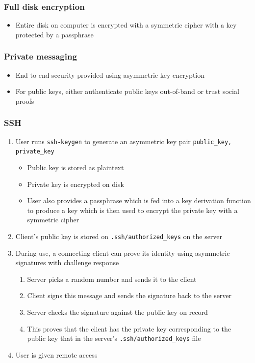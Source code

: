 \documentclass[letterpaper,12pt]{article}
\begin{document}
\subsubsection{Full disk encryption}
\begin{itemize}
 \item Entire disk on computer is encrypted with a symmetric cipher with a key protected by a passphrase
\end{itemize}

\subsubsection{Private messaging}
\begin{itemize}
 \item End-to-end security provided using asymmetric key encryption
 \item For public keys, either authenticate public keys out-of-band or trust social proofs
\end{itemize}

\subsubsection{SSH}
\begin{enumerate}
 \item User runs \lstinline{ssh-keygen} to generate an asymmetric key pair \lstinline{public_key, private_key}
       \begin{itemize}
        \item Public key is stored as plaintext
        \item Private key is encrypted on disk
        \item User also provides a passphrase which is fed into a key derivation function to produce a key which is then used to encrypt the private key with a symmetric cipher
       \end{itemize}
 \item Client's public key is stored on \lstinline{.ssh/authorized_keys} on the server
 \item During use, a connecting client can prove its identity using asymmetric signatures with challenge response
       \begin{enumerate}
        \item Server picks a random number and sends it to the client
        \item Client signs this message and sends the signature back to the server
        \item Server checks the signature against the public key on record
        \item This proves that the client has the private key corresponding to the public key that in the server's \lstinline{.ssh/authorized_keys} file
       \end{enumerate}
 \item User is given remote access
\end{enumerate}
\end{document}
